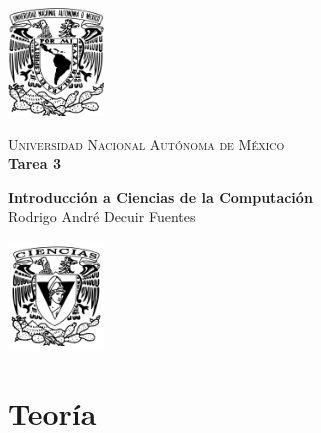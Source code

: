 \documentclass{report}
\begin{document}
    \begin{minipage}[t]{0.165 \textwidth}
       \begin{flushright}
        \includegraphics[width=1in]{EscudoUNAM.png}
       \end{flushright}
    \end{minipage}
    \begin{minipage}[H]{0.62 \textwidth}
        \begin{center}
            {\large \textsc{Universidad Nacional Autónoma de México}}
            \vspace{0.25cm}
            \\
            { \huge \textbf{Tarea 3}}
            \\
            \vspace{0.25cm}
            
            \textbf{Introducción a Ciencias de la Computación}
	   		\\
	        \vspace{0.25cm}
	        Rodrigo André Decuir Fuentes
            \vspace{0.2cm}
        \end{center}
        \vspace{0.05cm}
    \end{minipage}
    \begin{minipage}[t]{0.165 \textwidth}
        \begin{flushleft}
            \includegraphics[width=1in]{Fciencias_UNAM.png}
        \end{flushleft}
    \end{minipage}
\section*{Teoría}
\end{document}
